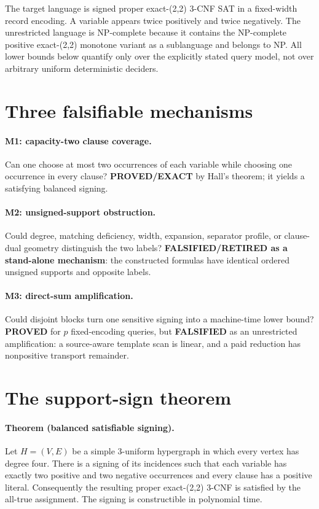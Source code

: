 \documentclass[11pt]{article}
\begin{document}
The target language is signed proper exact-(2,2) 3-CNF SAT in a fixed-width record
encoding.  A variable appears twice positively and twice negatively.  The unrestricted
language is NP-complete because it contains the NP-complete positive exact-(2,2) monotone
variant as a sublanguage and belongs to NP.  All lower bounds below quantify only over the
explicitly stated query model, not over arbitrary uniform deterministic deciders.

\section{Three falsifiable mechanisms}

\paragraph{M1: capacity-two clause coverage.}
Can one choose at most two occurrences of each variable while choosing one occurrence in
every clause?  \textbf{PROVED/EXACT} by Hall's theorem; it yields a satisfying balanced
signing.

\paragraph{M2: unsigned-support obstruction.}
Could degree, matching deficiency, width, expansion, separator profile, or clause-dual
geometry distinguish the two labels?  \textbf{FALSIFIED/RETIRED as a stand-alone
mechanism}: the constructed formulas have identical ordered unsigned supports and opposite
labels.

\paragraph{M3: direct-sum amplification.}
Could disjoint blocks turn one sensitive signing into a machine-time lower bound?
\textbf{PROVED} for $p$ fixed-encoding queries, but \textbf{FALSIFIED} as an unrestricted
amplification: a source-aware template scan is linear, and a paid reduction has nonpositive
transport remainder.

\section{The support-sign theorem}

\paragraph{Theorem (balanced satisfiable signing).}
Let $H=(V,E)$ be a simple 3-uniform hypergraph in which every vertex has degree four.
There is a signing of its incidences such that each variable has exactly two positive and
two negative occurrences and every clause has a positive literal.  Consequently the
resulting proper exact-(2,2) 3-CNF is satisfied by the all-true assignment.  The signing is
constructible in polynomial time.
\end{document}
